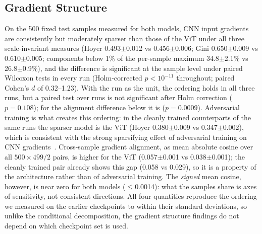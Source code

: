 \documentclass[conference]{IEEEtran}
\begin{document}
\subsection{Gradient Structure}
On the 500 fixed test samples measured for both models, CNN input gradients are consistently but moderately sparser than those of the ViT under all three scale-invariant measures (Hoyer 0.493$\pm$0.012 vs 0.456$\pm$0.006; Gini 0.650$\pm$0.009 vs 0.610$\pm$0.005; components below 1\% of the per-sample maximum 34.8$\pm$2.1\% vs 26.8$\pm$0.9\%), and the difference is significant at the sample level under paired Wilcoxon tests in every run (Holm-corrected $p<10^{-11}$ throughout; paired Cohen's $d$ of 0.32--1.23). With the run as the unit, the ordering holds in all three runs, but a paired test over runs is not significant after Holm correction ($p=0.108$); for the alignment difference below it is ($p=0.0009$). Adversarial training is what creates this ordering: in the cleanly trained counterparts of the same runs the sparser model is the ViT (Hoyer 0.380$\pm$0.009 vs 0.347$\pm$0.002), which is consistent with the strong sparsifying effect of adversarial training on CNN gradients~\cite{chalasani2020concise}. Cross-sample gradient alignment, as mean absolute cosine over all $500\times499/2$ pairs, is higher for the ViT (0.057$\pm$0.001 vs 0.038$\pm$0.001); the cleanly trained pair already shows this gap (0.058 vs 0.029), so it is a property of the architecture rather than of adversarial training. The \emph{signed} mean cosine, however, is near zero for both models ($\leq$0.0014): what the samples share is axes of sensitivity, not consistent directions. All four quantities reproduce the ordering we measured on the earlier checkpoints to within their standard deviations, so unlike the conditional decomposition, the gradient structure findings do not depend on which checkpoint set is used.
\end{document}
